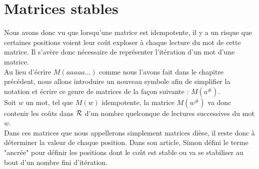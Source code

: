 \documentclass{report}
\begin{document}
\chapter{Matrices stables}
Nous avons donc vu que lorsqu'une matrice est idempotente, il y a un risque que certaines positions voient leur coût exploser à chaque lecture du mot de cette matrice. Il s'avère donc nécessaire de représenter l'itération d'un mot d'une matrice. \\
Au lieu d'écrire $M(aaaaa...)$ comme nous l'avons fait dans le chapitre précédent, nous allons introduire un nouveau symbole afin de simplifier la notation et écrire ce genre de matrices de la façon suivante : $M(a^{\#})$.\\

Soit $w$ un mot, tel que $M(w)$ idempotente, la matrice $M(w^{\#})$ va donc contenir les coûts dans $\mathcal{R}$ d'un nombre quelconque de lectures successives du mot $w$.\\
Dans ces matrices que nous appellerons simplement matrices dièse, il reste donc à déterminer la valeur de chaque position. Dans son article, Simon défini le terme "ancrée" pour définir les positions dont le coût est stable ou va se stabiliser au bout d'un nombre fini d'itération.\\
\end{document}
